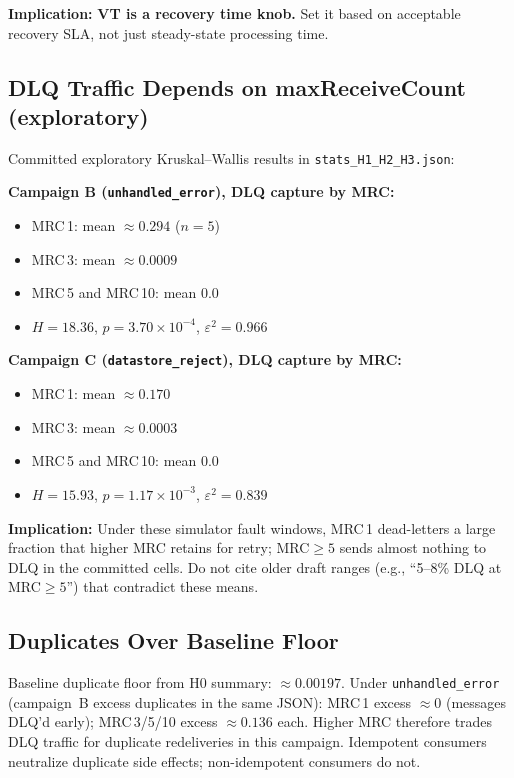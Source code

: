 \textbf{Implication:} \textbf{VT is a recovery time knob.} Set it based on acceptable recovery SLA, not just steady-state processing time.

\subsection{DLQ Traffic Depends on maxReceiveCount (exploratory)}

Committed exploratory Kruskal--Wallis results in \texttt{stats\_H1\_H2\_H3.json}:

\textbf{Campaign B (\texttt{unhandled\_error}), DLQ capture by MRC:}
\begin{itemize}
    \item MRC\,1: mean $\approx0.294$ ($n=5$)
    \item MRC\,3: mean $\approx0.0009$
    \item MRC\,5 and MRC\,10: mean $0.0$
    \item $H=18.36$, $p=3.70\times10^{-4}$, $\varepsilon^2=0.966$
\end{itemize}

\textbf{Campaign C (\texttt{datastore\_reject}), DLQ capture by MRC:}
\begin{itemize}
    \item MRC\,1: mean $\approx0.170$
    \item MRC\,3: mean $\approx0.0003$
    \item MRC\,5 and MRC\,10: mean $0.0$
    \item $H=15.93$, $p=1.17\times10^{-3}$, $\varepsilon^2=0.839$
\end{itemize}

\textbf{Implication:} Under these simulator fault windows, MRC\,1 dead-letters a large fraction that higher MRC retains for retry; MRC$\ge5$ sends almost nothing to DLQ in the committed cells. Do not cite older draft ranges (e.g., ``5--8\% DLQ at MRC$\ge5$'') that contradict these means.

\subsection{Duplicates Over Baseline Floor}

Baseline duplicate floor from H0 summary: $\approx0.00197$. Under \texttt{unhandled\_error} (campaign~B excess duplicates in the same JSON): MRC\,1 excess $\approx0$ (messages DLQ'd early); MRC\,3/5/10 excess $\approx0.136$ each. Higher MRC therefore trades DLQ traffic for duplicate redeliveries in this campaign. Idempotent consumers neutralize duplicate side effects; non-idempotent consumers do not.

